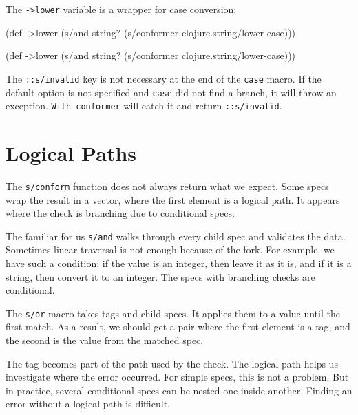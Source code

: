 \fi

\noindent
The \verb|->lower| variable is a wrapper for case conversion:

\ifx\DEVICETYPE\MOBILE

\begin{english}
  \begin{clojure}
(def ->lower
  (s/and
    string?
    (s/conformer
      clojure.string/lower-case)))
  \end{clojure}
\end{english}
\else

\begin{english}
  \begin{clojure}
(def ->lower
  (s/and
    string?
    (s/conformer clojure.string/lower-case)))
  \end{clojure}
\end{english}

\fi

The  \verb|::s/invalid| key is not necessary at the end of the \verb|case| macro. If the default option is not specified and \verb|case| did not find a branch, it will throw an exception. \verb|With-conformer| will catch it and return \verb|::s/invalid|.

\section{Logical Paths}


The \verb|s/conform| function does not always return what we expect. Some specs wrap the result in a vector, where the first element is a logical path. It appears where the check is branching due to conditional specs.

The familiar for us \verb|s/and| walks through every child spec and validates the data. Sometimes linear traversal is not enough because of the fork. For example, we have such a condition: if the value is an integer, then leave it as it is, and if it is a string, then convert it to an integer. The specs with branching checks are conditional.

The \verb|s/or| macro takes tags and child specs. It applies them to a value until the first match. As a result, we should get a pair where the first element is a tag, and the second is the value from the matched spec.

The tag becomes part of the path used by the check. The logical path helps us investigate where the error occurred. For simple specs, this is not a problem. But in practice, several conditional specs can be nested one inside another. Finding an error without a logical path is difficult.

